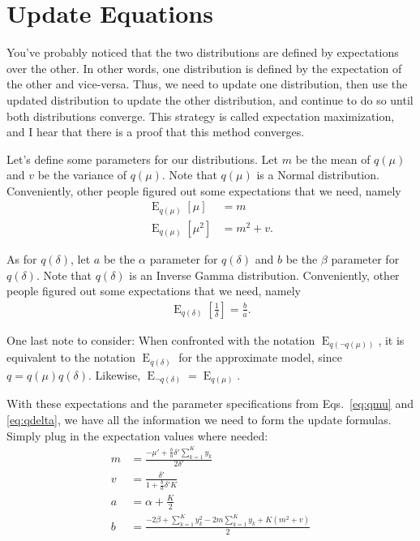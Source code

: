 \documentclass[12pt]{article}
\newcommand{\E}{\operatorname{E}}
\begin{document}
\section{Update Equations}

You've probably noticed that the two distributions are defined by expectations
over the other.  In other words, one distribution is defined by the expectation
of the other and vice-versa.  Thus, we need to update one distribution, then use
the updated distribution to update the other distribution, and continue to do so
until both distributions converge.  This strategy is called expectation
maximization, and I hear that there is a proof that this method converges.

Let's define some parameters for our distributions.  Let $m$ be the mean of
$q(\mu)$ and $v$ be the variance of $q(\mu)$.  Note that $q(\mu)$ is a Normal
distribution.  Conveniently, other people \autocite{gaussian} figured out some
expectations that we need, namely
\begin{align}
    \E_{q(\mu)}[\mu] &= m \\
    \E_{q(\mu)}[\mu^2] &= m^2 + v.
\end{align}

As for $q(\delta)$, let $a$ be the $\alpha$ parameter for $q(\delta)$ and $b$ be
the $\beta$ parameter for $q(\delta)$.  Note that $q(\delta)$ is an Inverse
Gamma distribution.  Conveniently, other people \autocite{invgamma} figured out
some expectations that we need, namely
\begin{align}
    \E_{q(\delta)}[\frac{1}{\delta}] = \frac{b}{a}.
\end{align}

One last note to consider:  When confronted with the notation
$\E_{q(\neg q(\mu))}$, it is equivalent to the notation $\E_{q(\delta)}$ for
the approximate model, since $q = q(\mu)q(\delta)$.  Likewise, $\E_{\neg
q(\delta)} = \E_{q(\mu)}$.

With these expectations and the parameter specifications from Eqs.~\ref{eq:qmu}
and \ref{eq:qdelta}, we have all the information we need to form the update
formulas.  Simply plug in the expectation values where needed:
\begin{align}
    m &= \frac{-\mu' + \frac{b}{a} \delta' \sum_{k=1}^{K}
    y_{k}}{2\delta'}
    \\
    v &= \frac{\delta'}{1 + \frac{b}{a}\delta'K}
    \\
    a &= \alpha + \frac{K}{2}
    \\
    b &= \frac{-2\beta + \sum_{k=1}^{K} y_{k}^{2} - 2m
    \sum_{k=1}^{K} y_{k} + K(m^2 + v)}{2}
\end{align}
\end{document}
